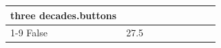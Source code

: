 \begin{table}[H]
\begin{tabular}{lllrlllll}
three decades.buttons \\
\cline{1-9}
False & 27.5%

\end{tabular}
\end{table}
